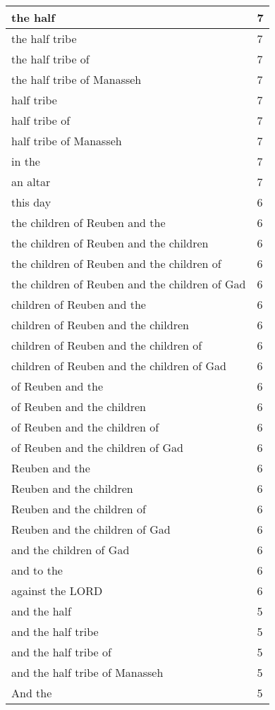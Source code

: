 \begin{center}
\begin{longtable}{|p{3.0in}|p{0.5in}|}
the half & 7\\ \hline 
the half tribe & 7\\ \hline 
the half tribe of & 7\\ \hline 
the half tribe of Manasseh & 7\\ \hline 
half tribe & 7\\ \hline 
half tribe of & 7\\ \hline 
half tribe of Manasseh & 7\\ \hline 
in the & 7\\ \hline 
an altar & 7\\ \hline 
this day & 6\\ \hline 
the children of Reuben and the & 6\\ \hline 
the children of Reuben and the children & 6\\ \hline 
the children of Reuben and the children of & 6\\ \hline 
the children of Reuben and the children of Gad & 6\\ \hline 
children of Reuben and the & 6\\ \hline 
children of Reuben and the children & 6\\ \hline 
children of Reuben and the children of & 6\\ \hline 
children of Reuben and the children of Gad & 6\\ \hline 
of Reuben and the & 6\\ \hline 
of Reuben and the children & 6\\ \hline 
of Reuben and the children of & 6\\ \hline 
of Reuben and the children of Gad & 6\\ \hline 
Reuben and the & 6\\ \hline 
Reuben and the children & 6\\ \hline 
Reuben and the children of & 6\\ \hline 
Reuben and the children of Gad & 6\\ \hline 
and the children of Gad & 6\\ \hline 
and to the & 6\\ \hline 
against the LORD & 6\\ \hline 
and the half & 5\\ \hline 
and the half tribe & 5\\ \hline 
and the half tribe of & 5\\ \hline 
and the half tribe of Manasseh & 5\\ \hline 
And the & 5\\ \hline 

\end{longtable}
\end{center}
